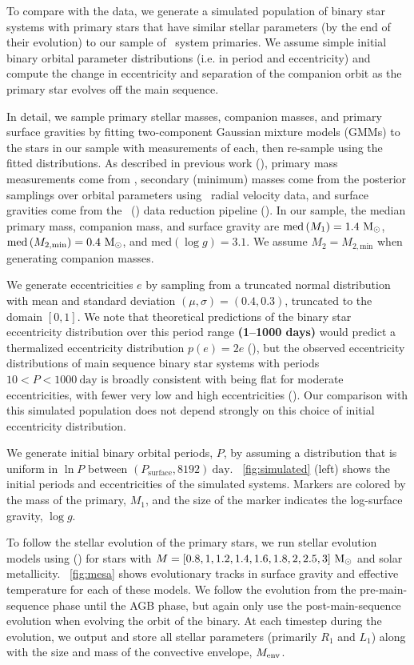 \documentclass[modern, letterpaper]{aastex62}
\newcommand{\apogee}{\project{\acronym{APOGEE}}}
\newcommand{\DR}{\acronym{DR14}}
\newcommand{\logg}{\ensuremath{\log g}}
\newcommand{\med}[1]{\ensuremath{\textrm{med}\left(#1\right)}}
\newcommand{\Psurf}{\ensuremath{P_\textrm{surface}}}
\renewcommand{\changes}[1]{\textbf{#1}}
\begin{document}
To compare with the data, we generate a simulated population of binary star
systems with primary stars that have similar stellar parameters (by the end of
their evolution) to our sample of \apogee\ system primaries.
We assume simple initial binary orbital parameter distributions (i.e. in period
and eccentricity) and compute the change in eccentricity and separation of the
companion orbit as the primary star evolves off the main sequence.

In detail, we sample primary stellar masses, companion masses, and primary
surface gravities by fitting two-component Gaussian mixture models (GMMs) to the
stars in our sample with measurements of each, then re-sample using the fitted
distributions.
As described in previous work (\citealt{Price-Whelan:2018}), primary mass
measurements come from \cite{Ness:2016}, secondary (minimum) masses come from
the posterior samplings over orbital parameters using \apogee\ radial velocity
data, and surface gravities come from the \apogee\ (\DR) data reduction pipeline
(\citealt{Garcia-Perez:2016}).
In our sample, the median primary mass, companion mass, and surface gravity are
$\med{M_1} = 1.4~\msun$, $\med{M_{2, \textrm{min}}} = 0.4~\msun$, and
$\med{\logg} = 3.1$.
We assume $M_2 = M_{2, \textrm{min}}$ when generating companion masses.

We generate eccentricities $e$ by sampling from a truncated normal distribution
with mean and standard deviation $(\mu, \sigma) = (0.4, 0.3)$, truncated to the
domain $[0, 1]$.
We note that theoretical predictions of the binary star eccentricity distribution over this period range \changes{(1--1000 days)} would predict a thermalized eccentricity distribution $p(e) = 2e$ (\citealt{Jeans:1919}), but the observed eccentricity distributions of main sequence binary star systems with periods $10 < P < 1000~\textrm{day}$ is broadly consistent with being flat for moderate eccentricities, with fewer very low and high eccentricities (\citealt{Duchene:2013}).
Our comparison with this simulated population does not depend strongly on this
choice of initial eccentricity distribution.

We generate initial binary orbital periods, $P$, by assuming a distribution that
is uniform in $\ln P$ between $(\Psurf, 8192)~\textrm{day}$.
\figurename~\ref{fig:simulated} (left) shows the initial periods and
eccentricities of the simulated systems.
Markers are colored by the mass of the primary, $M_1$, and the size of the
marker indicates the log-surface gravity, \logg.

To follow the stellar evolution of the primary stars, we run stellar evolution
models using  (\citealt{Paxton:2011}) for stars with $M = [0.8, 1,
1.2, 1.4, 1.6, 1.8, 2, 2.5, 3]~\mathrm{M}_\odot$ and solar metallicity.
\figurename~\ref{fig:mesa} shows evolutionary tracks in surface gravity and
effective temperature for each of these models.
We follow the evolution from the pre-main-sequence phase until the AGB phase,
but again only use the post-main-sequence evolution when evolving the orbit of
the binary.
At each timestep during the evolution, we output and store all stellar parameters (primarily $R_1$ and $L_1$) along with the size and mass of the convective envelope, $M_{\rm env}$.
\end{document}
